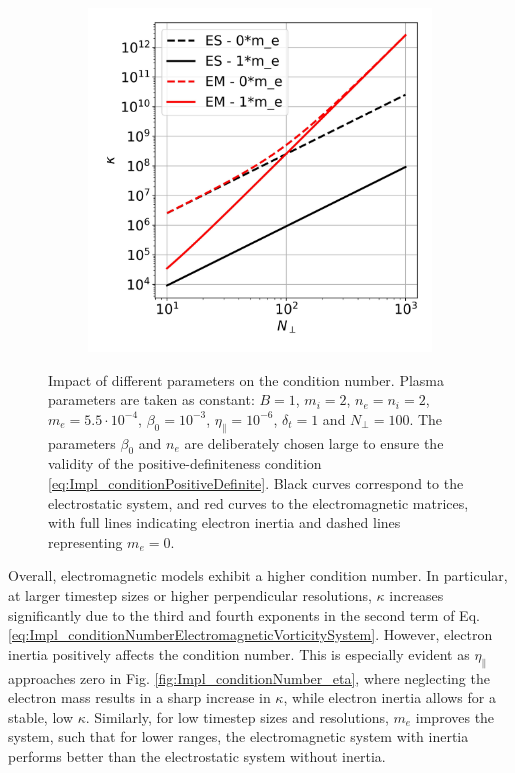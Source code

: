\begin{figure}[H]
\begin{subfigure}[t]{0.30\textwidth}
		\label{fig:Impl_conditionNumber_dt}
	\end{subfigure}
	\begin{subfigure}[t]{0.30\textwidth}
		\centering
		\includegraphics[width=1\textwidth]{schemes/conditionNumber_Nperp.jpg}
		\label{fig:Impl_conditionNumber_Nperp}
	\end{subfigure}
	\caption{Impact of different parameters on the condition number. Plasma parameters are taken as constant: $B=1$, $m_i = 2$, $n_e = n_i = 2$, $m_e = 5.5\cdot 10^{-4}$, $\beta_0 = 10^{-3}$, $\eta_\parallel = 10^{-6}$, $\delta_t = 1$ and $N_\perp = 100$. The parameters $\beta_0$ and $n_e$ are deliberately chosen large to ensure the validity of the positive-definiteness condition \ref{eq:Impl_conditionPositiveDefinite}. Black curves correspond to the electrostatic system, and red curves to the electromagnetic matrices, with full lines indicating electron inertia and dashed lines representing $m_e = 0$.}
	\label{fig:Impl_conditionNumber}
\end{figure}

Overall, electromagnetic models exhibit a higher condition number. In particular, at larger timestep sizes or higher perpendicular resolutions, $\kappa$ increases significantly due to the third and fourth exponents in the second term of Eq. \ref{eq:Impl_conditionNumberElectromagneticVorticitySystem}. However, electron inertia positively affects the condition number. This is especially evident as $\eta_\parallel$ approaches zero in Fig. \ref{fig:Impl_conditionNumber_eta}, where neglecting the electron mass results in a sharp increase in $\kappa$, while electron inertia allows for a stable, low $\kappa$. Similarly, for low timestep sizes and resolutions, $m_e$ improves the system, such that for lower ranges, the electromagnetic system with inertia performs better than the electrostatic system without inertia.

 



